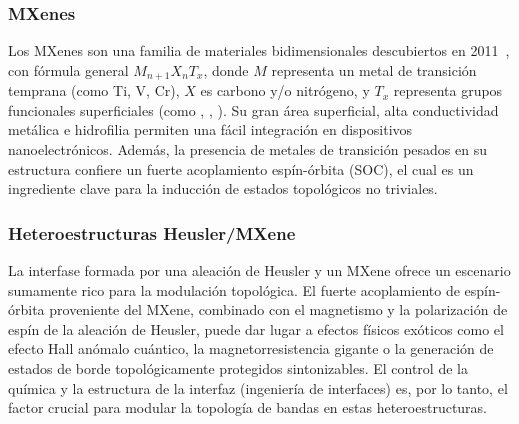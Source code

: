 \subsubsection{MXenes}
Los MXenes son una familia de materiales bidimensionales descubiertos en 2011~\cite{naguib2011two}, con fórmula general $M_{n+1}X_n T_x$, donde $M$ representa un metal de transición temprana (como Ti, V, Cr), $X$ es carbono y/o nitrógeno, y $T_x$ representa grupos funcionales superficiales (como , , ). Su gran área superficial, alta conductividad metálica e hidrofilia permiten una fácil integración en dispositivos nanoelectrónicos. Además, la presencia de metales de transición pesados en su estructura confiere un fuerte acoplamiento espín-órbita (SOC), el cual es un ingrediente clave para la inducción de estados topológicos no triviales.

\subsubsection{Heteroestructuras Heusler/MXene}
La interfase formada por una aleación de Heusler y un MXene ofrece un escenario sumamente rico para la modulación topológica. El fuerte acoplamiento de espín-órbita proveniente del MXene, combinado con el magnetismo y la polarización de espín de la aleación de Heusler, puede dar lugar a efectos físicos exóticos como el efecto Hall anómalo cuántico, la magnetorresistencia gigante o la generación de estados de borde topológicamente protegidos sintonizables. El control de la química y la estructura de la interfaz (ingeniería de interfaces) es, por lo tanto, el factor crucial para modular la topología de bandas en estas heteroestructuras.
